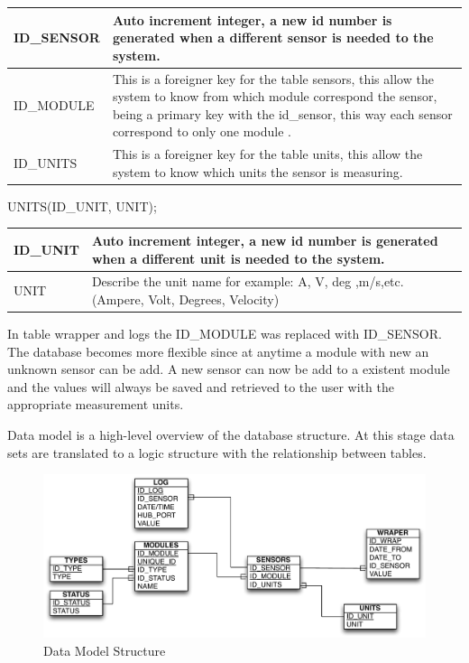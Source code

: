 \begin{table}[H]
\centering
	\begin{tabular}{| p{2cm} | p{10cm} |}
		\hline
		ID\_SENSOR & Auto increment integer, a new id number is generated when a different sensor is needed to the system. \\\hline
		ID\_MODULE & This is a foreigner key for the table sensors, this allow the system to know from which module correspond the sensor, being a primary key with the id\_sensor, this way each sensor correspond to only one module .\\\hline
		ID\_UNITS & This is a foreigner key for the table units, this allow the system to know which units the sensor is measuring.\\\hline
	\end{tabular}
\end{table}

UNITS(ID\_UNIT, UNIT);

\begin{table}[H]
\centering
	\begin{tabular}{| p{2cm} | p{10cm} |}
		\hline
		ID\_UNIT & Auto increment integer, a new id number is generated when a different unit is needed to the system. \\\hline
		UNIT & Describe the unit name for example: A, V, deg ,m/s,etc. (Ampere, Volt, Degrees, Velocity)\\\hline
	\end{tabular}
\end{table}

In table wrapper and logs the ID\_MODULE was replaced with ID\_SENSOR. The database becomes more flexible since at anytime a module with new an unknown sensor can be add. A new sensor can now be add to a existent module and the values will always be saved and retrieved to the user with the appropriate measurement units.


Data model is a high-level overview of the database structure. At this stage data sets are translated to a logic structure with the relationship between tables.

\begin{figure}[H]
	\begin{centering}
		\includegraphics[width=1.0\textwidth]{content/appendix/eudp/images/db_structure.pdf}
		\caption{Data Model Structure}
	\end{centering}
\end{figure}


